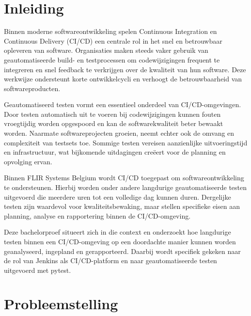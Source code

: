 
\section{Inleiding}
\label{sec:inleiding}

Binnen moderne softwareontwikkeling spelen Continuous Integration en Continuous Delivery (CI/CD) een centrale rol in het snel en betrouwbaar opleveren van software. Organisaties maken steeds vaker gebruik van geautomatiseerde build- en testprocessen om codewijzigingen frequent te integreren en snel feedback te verkrijgen over de kwaliteit van hun software. Deze werkwijze ondersteunt korte ontwikkelcycli en verhoogt de betrouwbaarheid van softwareproducten.

Geautomatiseerd testen vormt een essentieel onderdeel van CI/CD-omgevingen. Door testen automatisch uit te voeren bij codewijzigingen kunnen fouten vroegtijdig worden opgespoord en kan de softwarekwaliteit beter bewaakt worden. Naarmate softwareprojecten groeien, neemt echter ook de omvang en complexiteit van testsets toe. Sommige testen vereisen aanzienlijke uitvoeringstijd en infrastructuur, wat bijkomende uitdagingen creëert voor de planning en opvolging ervan.

Binnen FLIR Systems Belgium wordt CI/CD toegepast om softwareontwikkeling te ondersteunen. Hierbij worden onder andere langdurige geautomatiseerde testen uitgevoerd die meerdere uren tot een volledige dag kunnen duren. Dergelijke testen zijn waardevol voor kwaliteitsbewaking, maar stellen specifieke eisen aan planning, analyse en rapportering binnen de CI/CD-omgeving.

Deze bachelorproef situeert zich in die context en onderzoekt hoe langdurige testen binnen een CI/CD-omgeving op een doordachte manier kunnen worden geanalyseerd, ingepland en gerapporteerd. Daarbij wordt specifiek gekeken naar de rol van Jenkins als CI/CD-platform en naar geautomatiseerde testen uitgevoerd met pytest.


\section{Probleemstelling}

